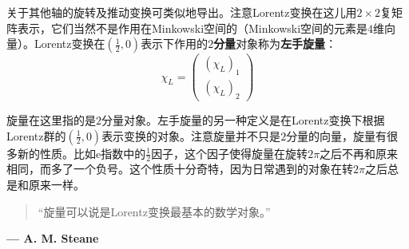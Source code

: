 关于其他轴的旋转及推动变换可类似地导出。注意Lorentz变换在这儿用$2 \times 2$复矩阵表示，它们当然不是作用在Minkowski空间的（Minkowski空间的元素是$4$维向量）。Lorentz变换在$(\frac{1}{2}, 0)$表示下作用的{\bfseries $2$分量}对象称为{\bfseries 左手旋量}：
\begin{equation}
\label{equ3.179}
	\chi_L =
		\begin{pmatrix}
			(\chi_L)_1 \\
			(\chi_L)_2
		\end{pmatrix}
\end{equation}

旋量在这里指的是$2$分量对象。左手旋量的另一种定义是在Lorentz变换下根据Lorentz群的$(\frac{1}{2}, 0)$表示变换的对象。注意旋量并不只是$2$分量的向量，旋量有很多新的性质。比如$\mathrm{e}$指数中的$\frac{1}{2}$因子，这个因子使得旋量在旋转$2\pi$之后不再和原来相同，而多了一个负号。这个性质十分奇特，因为日常遇到的对象在转$2\pi$之后总是和原来一样。

\begin{quote}
	“旋量可以说是Lorentz变换最基本的数学对象。”
\end{quote}

\begin{flushright}
{\bfseries  ---  A. M. Steane}
\end{flushright}

